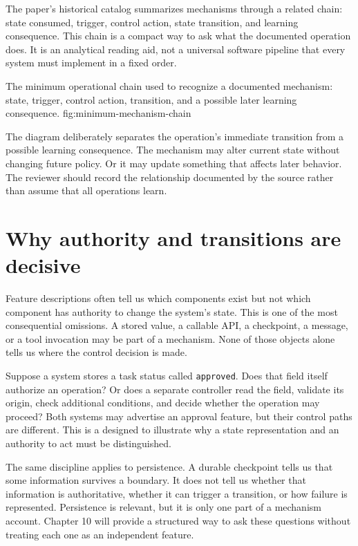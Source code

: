 The paper's historical catalog summarizes mechanisms through a related chain: state consumed, trigger, control action, state transition, and learning consequence. This chain is a compact way to ask what the documented operation does. It is an analytical reading aid, not a universal software pipeline that every system must implement in a fixed order.

  {The minimum operational chain used to recognize a documented mechanism: state, trigger, control action, transition, and a possible later learning consequence.}
  {fig:minimum-mechanism-chain}

The diagram deliberately separates the operation's immediate transition from a possible learning consequence. The mechanism may alter current state without changing future policy. Or it may update something that affects later behavior. The reviewer should record the relationship documented by the source rather than assume that all operations learn.

\section{Why authority and transitions are decisive}
\label{sec:authority-transition}

Feature descriptions often tell us which components exist but not which component has authority to change the system's state. This is one of the most consequential omissions. A stored value, a callable API, a checkpoint, a message, or a tool invocation may be part of a mechanism. None of those objects alone tells us where the control decision is made.

Suppose a system stores a task status called \texttt{approved}. Does that field itself authorize an operation? Or does a separate controller read the field, validate its origin, check additional conditions, and decide whether the operation may proceed? Both systems may advertise an approval feature, but their control paths are different. This is a \BookExampleLabel{} designed to illustrate why a state representation and an authority to act must be distinguished.

The same discipline applies to persistence. A durable checkpoint tells us that some information survives a boundary. It does not tell us whether that information is authoritative, whether it can trigger a transition, or how failure is represented. Persistence is relevant, but it is only one part of a mechanism account. Chapter 10 will provide a structured way to ask these questions without treating each one as an independent feature.

